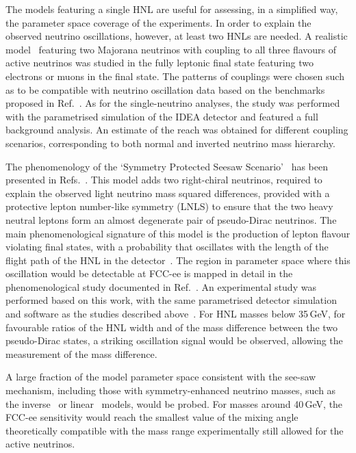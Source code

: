 The models featuring a single HNL are useful for assessing, in a simplified way, the parameter space coverage of the experiments. 
In order to explain the observed neutrino oscillations, however, at least two HNLs are needed. 
A realistic model~\cite{Tastet:2021vwp} featuring two Majorana neutrinos with coupling to all three flavours of active neutrinos 
was studied in the fully leptonic final state featuring two electrons or muons in the final state. 
The patterns of couplings were chosen such as to be compatible with neutrino oscillation data 
based on the benchmarks proposed in Ref.~\cite{Abdullahi:2022jlv}. 
As for the single-neutrino analyses, 
the study was performed with the parametrised simulation of the IDEA detector and featured a full background analysis. 
An estimate of the reach was obtained for different coupling scenarios, 
corresponding to both normal and inverted neutrino mass hierarchy.

The phenomenology of the `Symmetry Protected Seesaw Scenario'~\cite{Shaposhnikov:2006nn, Kersten:2007vk} 
has been presented in Refs.~\cite{Antusch:2016ejd, Antusch:2022ceb}. 
This model adds two right-chiral neutrinos, required to explain the observed light neutrino mass squared differences, 
provided with a protective lepton number-like symmetry (LNLS) 
to ensure that the two heavy neutral leptons form an almost degenerate pair of pseudo-Dirac neutrinos.
The main phenomenological signature of this model is the production of lepton flavour violating final states, 
with a probability that oscillates with the length of the flight path of the HNL in the detector~\cite{Antusch:2023jsa}. 
The region in parameter space where this oscillation would be detectable at FCC-ee 
is mapped in detail in the phenomenological study documented in Ref.~\cite{Antusch:2024otj}. 
An experimental study was performed based on this work, 
with the same parametrised detector simulation and software as the studies described above~\cite{note_HNL_Polesello_Valle}. 
For HNL masses below 35\,GeV, for favourable ratios of the HNL width and of the mass difference between the two pseudo-Dirac states, 
a striking oscillation signal would be observed, allowing the measurement of the mass difference.

A large fraction of the model parameter space consistent with the see-saw mechanism, 
including those with symmetry-enhanced neutrino masses, 
such as the inverse~\cite{Mohapatra:1986bd} or linear~\cite{Akhmedov:1995ip,Akhmedov:1995vm} models, 
would be probed. 
For masses around 40\,GeV, the FCC-ee sensitivity would reach the smallest value of the mixing angle 
theoretically compatible with the mass range experimentally still allowed for the active neutrinos.

